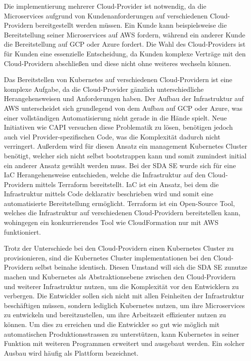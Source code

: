 Die implementierung mehrerer Cloud-Provider ist notwendig, da die Microservices aufgrund von Kundenanforderungen auf verschiedenen Cloud-Providern bereitgestellt werden müssen.
Ein Kunde kann beispielsweise die Bereitstellung seiner Microservices auf AWS fordern, während ein anderer Kunde die Bereitstellung auf GCP oder Azure fordert.
Die Wahl des Cloud-Providers ist für Kunden eine essenzielle Entscheidung, da Kunden komplexe Verträge mit den Cloud-Providern abschließen und diese nicht ohne weiteres wechseln können.
\medskip

Das Bereitstellen von Kubernetes auf verschiedenen Cloud-Providern ist eine komplexe Aufgabe, da die Cloud-Provider gänzlich unterschiedliche Herangehensweisen und Anforderungen haben.
Der Aufbau der Infrastruktur auf AWS unterscheidet sich grundlegend von dem Aufbau auf GCP oder Azure, was einer vollständigen Automatisierung nicht gerade in die Hände spielt.
Neue Initiativen wie \ac{CAPI} versuchen diese Problematik zu lösen, benötigen jedoch auch viel Provider-spezifischen Code, was die Komplexität dadurch nicht verringert.
Außerdem wird für diesen Ansatz ein management Kubernetes Cluster benötigt, welcher sich nicht selbst bootstrappen kann und somit zumindest initial ein anderer Ansatz gewählt werden muss.
Bei der SDA SE wurde sich für eine \ac{IaC} Herangehensweise entschieden, welche die Infrastruktur auf den Cloud-Providern mittels Terraform bereitstellt.
IaC ist ein Ansatz, bei dem die Infrastruktur mittels Code deklarativ beschrieben wird und somit eine automatisierte Bereitstellung ermöglicht.
Terraform ist ein Open-Source Tool, welches die Infrastruktur auf verschiedenen Cloud-Providern bereitstellen kann, wohingegen ein konkurrierendes Tool wie CloudFormation nur mit AWS funktioniert.
\medskip

Trotz der Unterschiede bei den Cloud-Providern einen Kubernetes Cluster zu provisionieren, sind die Kubernetes Cluster implementationen bei den Cloud-Providern selbst beinahe identisch.
Diesen Umstand will sich die SDA SE zunutze machen und Kubernetes als Abstraktionsebene zwischen den Cloud-Providern und weiterer Infrastruktur nutzen, um die Komplexität vor den Entwicklern zu verbergen.
Die Entwickler sollen sich nicht mit allen Feinheiten der Infrastruktur beschäftigen müssen, sondern lediglich Kubernetes nutzen, um ihre Microservices zu entwickeln und bereitzustellen, um ihre Arbeitszeit effizienter nutzen zu können.
Um dies zu erreichen und die Entwickler so gut wie möglich mit automatischen Produktionsstrassen zu unterstützen, kann Kubernetes in seiner Funktion mit weiteren Programmen erweitert und ausgebaut werden.
Ein solcher Ausbau wird häufig als Plattform bezeichnet.
\medskip

